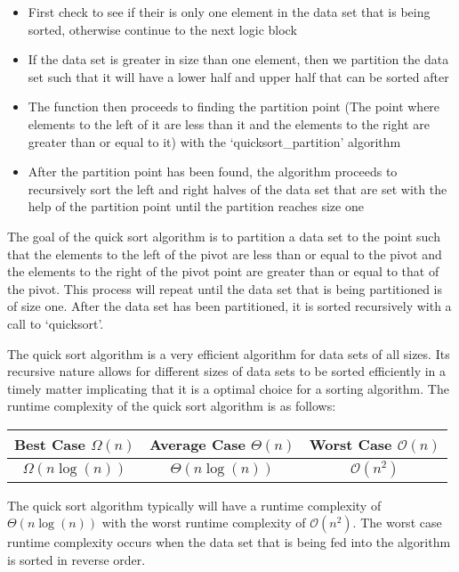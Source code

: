 \begin{highlight}
\begin{itemize}
    \item First check to see if their is only one element in the data set that is being sorted, otherwise continue to the next logic block
    \item If the data set is greater in size than one element, then we partition the data set such that it will have a lower half and upper half that can be sorted after
    \item The function then proceeds to finding the partition point (The point where elements to the left of it are less than it and the elements to the right are greater than or equal to it) with the `quicksort\_partition' algorithm
    \item After the partition point has been found, the algorithm proceeds to recursively sort the left and right halves of the data set that are set with the help of the partition point until the partition reaches size one
\end{itemize}

\noindent The goal of the quick sort algorithm is to partition a data set to the point such that the elements to the left of the pivot are less than or equal to the pivot and the elements to the right of the pivot point are greater than or equal to that of the pivot. This process will repeat until the data set that is being partitioned is of size one.
After the data set has been partitioned, it is sorted recursively with a call to `quicksort'.

The quick sort algorithm is a very efficient algorithm for data sets of all sizes. Its recursive nature allows for different sizes of data sets to be sorted efficiently in a timely matter implicating that it is a optimal choice for a sorting algorithm. The runtime complexity of the quick sort algorithm is as follows:

\begin{center}
    \begin{tabular}{|c|c|c|}
        \hline \textbf{Best Case $\Omega(n)$} & \textbf{Average Case $\Theta(n)$} & \textbf{Worst Case $\mathcal{O}(n)$} \\ \hline
        $\Omega(n\log{(n)})$ & $\Theta(n\log{(n)})$ & $\mathcal{O}(n^2)$ \\ \hline
    \end{tabular}
\end{center}

\noindent The quick sort algorithm typically will have a runtime complexity of $\Theta(n\log{(n)})$ with the worst runtime complexity of $\mathcal{O}(n^2)$. The worst case runtime complexity occurs when the data set that is being fed into the algorithm is sorted in reverse order.
\end{highlight}

\clearpage